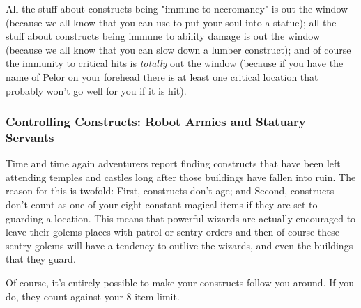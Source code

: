 All the stuff about constructs being "immune to necromancy" is out the window (because we all know that you can use  to put your soul into a statue); all the stuff about constructs being immune to ability damage is out the window (because we all know that you can slow down a lumber construct); and of course the immunity to critical hits is \textit{totally} out the window (because if you have the name of Pelor on your forehead there is at least one critical location that probably won't go well for you if it is hit).

\subsubsection{Controlling Constructs: Robot Armies and Statuary Servants}

Time and time again adventurers report finding constructs that have been left attending temples and castles long after those buildings have fallen into ruin. The reason for this is twofold: First, constructs don't age; and Second, constructs don't count as one of your eight constant magical items if they are set to guarding a location. This means that powerful wizards are actually encouraged to leave their golems places with patrol or sentry orders and then of course these sentry golems will have a tendency to outlive the wizards, and even the buildings that they guard.

Of course, it's entirely possible to make your constructs follow you around. If you do, they count against your 8 item limit.


